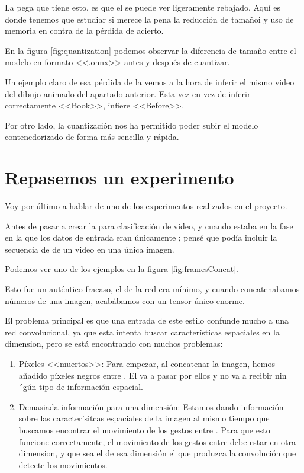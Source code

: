 La pega que tiene esto, es que el  se puede ver ligeramente rebajado. Aquí es donde tenemos que estudiar si merece la pena la reducción de tamañoi y uso de memoria en contra de la pérdida de acierto.

En la figura \ref{fig:quantization} podemos observar la diferencia de tamaño entre el modelo en formato <<.onnx>> antes y después de cuantizar.


Un ejemplo claro de esa pérdida de  la vemos a la hora de inferir el mismo video del dibujo animado del apartado anterior. Esta vez en vez de inferir correctamente <<Book>>, infiere <<Before>>.

Por otro lado, la cuantización nos ha permitido poder subir el modelo contenedorizado de forma más sencilla y rápida.

\section{Repasemos un experimento}

Voy por último a hablar de uno de los experimentos realizados en el proyecto.

Antes de pasar a crear la  para clasificación de video, y cuando estaba en la fase en la que los datos de entrada eran únicamente ; pensé que podía incluir la secuencia de  de un video en una única imagen.

Podemos ver uno de los ejemplos en la figura \ref{fig:framesConcat}.


Esto fue un auténtico fracaso, el  de la red era mínimo, y cuando concatenabamos números  de una imagen, acabábamos con un tensor único enorme.

El problema principal es que una entrada de este estilo confunde mucho a una red convolucional, ya que esta intenta buscar características espaciales en la dimension, pero se está encontrando con muchos problemas:

\begin{enumerate}
  \item Píxeles <<muertos>>: Para empezar, al concatenar la imagen, hemos añadido píxeles negros entre . El  va a pasar por ellos y no va a recibir nin´gún tipo de información espacial.
  \item Demasiada información para una dimensión: Estamos dando información sobre las caracterísitcas espaciales de la imagen al mismo tiempo que buscamos encontrar el movimiento de los gestos entre 
        . Para que esto funcione correctamente, el movimiento de los gestos entre 
        debe estar en otra dimension, y que sea el  de esa dimensión el que produzca la convolución que detecte los movimientos.
\end{enumerate}

